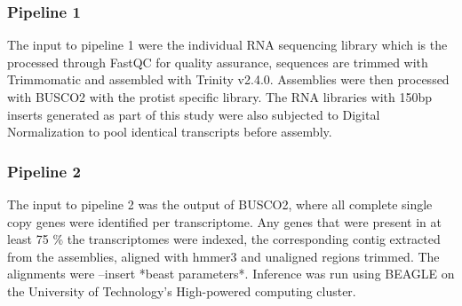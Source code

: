 \documentclass[12pt]{article}
\begin{document}
\subsubsection*{Pipeline 1}
The input to pipeline 1 were the individual RNA sequencing library which is the processed through FastQC for quality assurance, sequences are trimmed with Trimmomatic and assembled with Trinity v2.4.0. Assemblies were then processed with BUSCO2 with the protist specific library.
The RNA libraries with 150bp inserts generated as part of this study were also subjected to Digital Normalization to pool identical transcripts before assembly.                                                                                                                                                                                                                                                                                                                                                                                                                                                                                                                                                                                                                                                                                                                                                                                                                                                                                                                                                                                                                                                                                                                                                                                                                                                                                                                                           
\subsubsection*{Pipeline 2}
The input to pipeline 2 was the output of BUSCO2, where all complete single copy genes were identified per transcriptome. Any genes that were present in at least 75 \% the transcriptomes were indexed, the corresponding contig extracted from the assemblies, aligned with hmmer3 and unaligned regions trimmed. The alignments were --insert *beast parameters*. Inference was run using BEAGLE \cite{ayres2011beagle} on the University of Technology's High-powered computing cluster.
\end{document}
